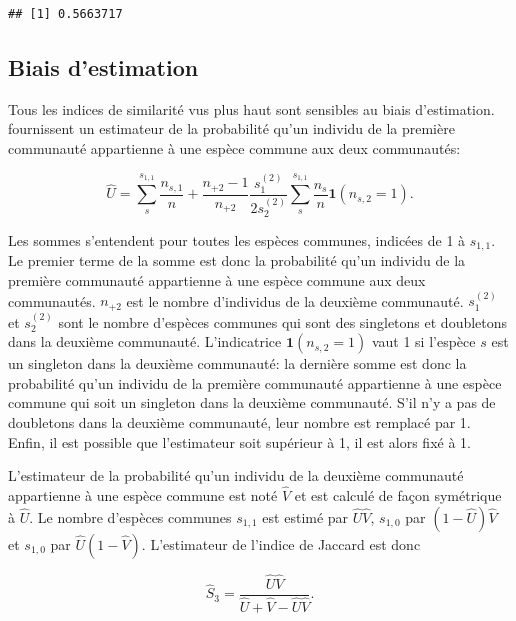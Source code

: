 \documentclass[
  11pt,
  french,
  a4paper,
  extrafontsizes,onecolumn,openright
  ]{memoir}
\begin{document}
\begin{verbatim}
## [1] 0.5663717
\end{verbatim}

\normalsize

\subsection{Biais d'estimation}\label{biais-destimation}

Tous les indices de similarité vus plus haut sont sensibles au biais d'estimation.
\textcite{Chao2004a} fournissent un estimateur de la probabilité qu'un individu de la première communauté appartienne à une espèce commune aux deux communautés:

\begin{equation}
  \label{eq:Chao2004a}
  \hat{U} = \sum_{s}^{s_{1,1}}{\frac{n_{s,1}}{n}} + \frac{n_{+2}-1}{n_{+2}} \frac{s_1^{(2)}}{2 s_2^{(2)}} \sum_{s}^{s_{1,1}}{\frac{n_s}{n}{\mathbf 1}\left( n_{s,2}=1 \right)}.
\end{equation}

Les sommes s'entendent pour toutes les espèces communes, indicées de 1 à \(s_{1,1}\).
Le premier terme de la somme est donc la probabilité qu'un individu de la première communauté appartienne à une espèce commune aux deux communautés.
\(n_{+2}\) est le nombre d'individus de la deuxième communauté.
\(s_1^{(2)}\) et \(s_2^{(2)}\) sont le nombre d'espèces communes qui sont des singletons et doubletons dans la deuxième communauté.
L'indicatrice \({\mathbf 1}(n_{s,2}=1)\) vaut 1 si l'espèce \(s\) est un singleton dans la deuxième communauté: la dernière somme est donc la probabilité qu'un individu de la première communauté appartienne à une espèce commune qui soit un singleton dans la deuxième communauté.
S'il n'y a pas de doubletons dans la deuxième communauté, leur nombre est remplacé par 1.
Enfin, il est possible que l'estimateur soit supérieur à 1, il est alors fixé à 1.

L'estimateur de la probabilité qu'un individu de la deuxième communauté appartienne à une espèce commune est noté \(\hat{V}\) et est calculé de façon symétrique à \(\hat{U}\).
Le nombre d'espèces communes \(s_{1,1}\) est estimé par \(\hat{U}\hat{V}\), \(s_{1,0}\) par \((1-\hat{U})\hat{V}\) et \(s_{1,0}\) par \(\hat{U}(1-\hat{V})\).
L'estimateur de l'indice de Jaccard est donc

\begin{equation}
  \label{eq:EstS3}
  \hat{S}_3 = \frac{\hat{U}\hat{V}}{\hat{U}+\hat{V}-\hat{U}\hat{V}}.
\end{equation}
\end{document}
